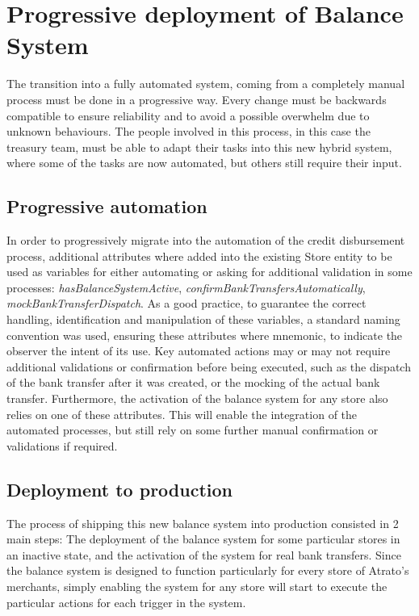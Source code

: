 \chapter{Progressive deployment of Balance System}

The transition into a fully automated system, coming from a completely manual process must be done in a progressive way. Every change must be backwards compatible to ensure reliability and to avoid a possible overwhelm due to unknown behaviours. The people involved in this process, in this case the treasury team, must be able to adapt their tasks into this new hybrid system, where some of the tasks are now automated, but others still require their input.

\section{Progressive automation}

In order to progressively migrate into the automation of the credit disbursement process, additional attributes where added into the existing Store entity to be used as variables for either automating or asking for additional validation in some processes: \textit{hasBalanceSystemActive}, \textit{confirmBankTransfersAutomatically}, \textit{mockBankTransferDispatch}. As a good practice, to guarantee the correct handling, identification and manipulation of these variables, a standard naming convention was used, ensuring these attributes where mnemonic, to indicate the observer the intent of its use. \cite{oracle} Key automated actions may or may not require additional validations or confirmation before being executed, such as the dispatch of the bank transfer after it was created, or the mocking of the actual bank transfer. Furthermore, the activation of the balance system for any store also relies on one of these attributes.  This will enable the integration of the automated processes, but still rely on some further manual confirmation or validations if required.\\

\section{Deployment to production}

The process of shipping this new balance system into production consisted in 2 main steps: The deployment of the balance system for some particular stores in an inactive state, and the activation of the system for real bank transfers. Since the balance system is designed to function particularly for every store of Atrato's merchants, simply enabling the system for any store will start to execute the particular actions for each trigger in the system.\\
    
